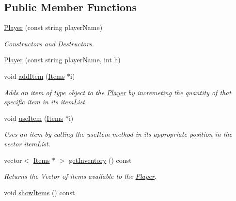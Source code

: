 \subsection*{Public Member Functions}
\begin{DoxyCompactItemize}
\item 
\hyperlink{classPlayer_a8d83d0f0e6ff61b2003b9769c8be3f88}{Player} (const string playerName)
\begin{DoxyCompactList}\small\item\em Constructors and Destructors. \item\end{DoxyCompactList}\item 
\hyperlink{classPlayer_a25291eed6de2d4ffe9f72422c79af64c}{Player} (const string playerName, int h)
\item 
\hypertarget{classPlayer_a5eabedb92d98c4b70fa2b1882404f058}{
void \hyperlink{classPlayer_a5eabedb92d98c4b70fa2b1882404f058}{addItem} (\hyperlink{classItems}{Items} $\ast$i)}
\label{classPlayer_a5eabedb92d98c4b70fa2b1882404f058}

\begin{DoxyCompactList}\small\item\em Adds an item of type object to the \hyperlink{classPlayer}{Player} by incremeting the quantity of that specific item in its itemList. \item\end{DoxyCompactList}\item 
\hypertarget{classPlayer_a704c8bad5a62ecf3a0e07a091380ff58}{
void \hyperlink{classPlayer_a704c8bad5a62ecf3a0e07a091380ff58}{useItem} (\hyperlink{classItems}{Items} $\ast$i)}
\label{classPlayer_a704c8bad5a62ecf3a0e07a091380ff58}

\begin{DoxyCompactList}\small\item\em Uses an item by calling the useItem method in its appropriate position in the vector itemList. \item\end{DoxyCompactList}\item 
\hypertarget{classPlayer_a896a4cdfdc5f616c32e5b2ac2cb6b72f}{
vector$<$ \hyperlink{classItems}{Items} $\ast$ $>$ \hyperlink{classPlayer_a896a4cdfdc5f616c32e5b2ac2cb6b72f}{getInventory} () const }
\label{classPlayer_a896a4cdfdc5f616c32e5b2ac2cb6b72f}

\begin{DoxyCompactList}\small\item\em Returns the Vector of items available to the \hyperlink{classPlayer}{Player}. \item\end{DoxyCompactList}\item 
\hypertarget{classPlayer_a70d4c5eb304121aaa606569d522cf1ba}{
void \hyperlink{classPlayer_a70d4c5eb304121aaa606569d522cf1ba}{showItems} () const }
\label{classPlayer_a70d4c5eb304121aaa606569d522cf1ba}


\end{DoxyCompactItemize}

